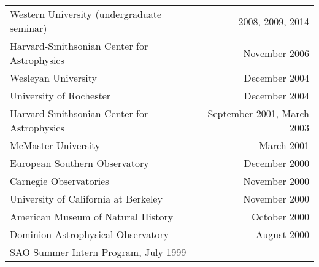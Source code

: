 \documentclass[12pt]{article}
\begin{document}
\begin{tabularx}{\textwidth}{Xr}
Western University (undergraduate seminar)& 2008, 2009, 2014\\
Harvard-Smithsonian Center for Astrophysics& November 2006\\
Wesleyan University& December 2004\\
University of Rochester& December 2004\\
Harvard-Smithsonian Center for Astrophysics& September 2001, March 2003\\
McMaster University& March 2001\\
European Southern Observatory& December 2000\\
Carnegie Observatories& November 2000\\
University of California at Berkeley& November 2000\\
American Museum of Natural History& October 2000\\
Dominion Astrophysical Observatory& August 2000\\
SAO Summer Intern Program, July 1999 %
\end{tabularx}

\clearpage

\begin{publications}

\printbibliography[title={Submitted refereed publications},keyword=submit]

\printbibliography[title={Refereed publications},keyword=ref]

\setcounter{papers}{0}
\printbibliography[title={Conference presentations},keyword=unref]


\end{publications}
\end{document}
